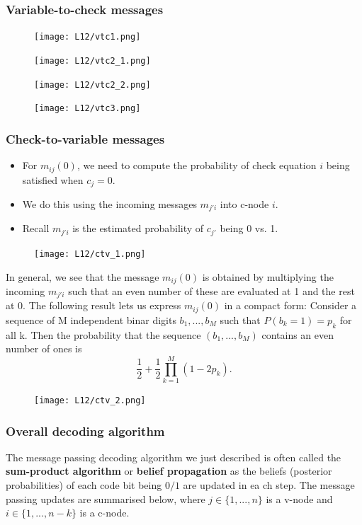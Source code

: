\documentclass[12pt]{article}
\begin{document}
\subsubsection{Variable-to-check messages}
\begin{figure}[H]
    \centering
    \texttt{[image: L12/vtc1.png]}
\end{figure}
\begin{figure}[H]
    \centering
    \texttt{[image: L12/vtc2\_1.png]}
\end{figure}
\begin{figure}[H]
    \centering
    \texttt{[image: L12/vtc2\_2.png]}
\end{figure}
\begin{figure}[H]
    \centering
    \texttt{[image: L12/vtc3.png]}
\end{figure}
\subsubsection{Check-to-variable messages}
\begin{itemize}
    \item For $m_{ij}(0)$, we need to compute the probability of check equation $i$ being satisfied when $c_j=0$.
    \item We do this using the incoming messages $m_{j'i}$ into c-node $i$.
    \item Recall $m_{j'i}$ is the estimated probability of $c_{j'}$ being 0 vs. 1.
\end{itemize}
\begin{figure}[H]
    \centering
    \texttt{[image: L12/ctv\_1.png]}
\end{figure}
In general, we see that the message $m_{ij}(0)$ is obtained by multiplying the incoming $m_{j'i}$ such that an even number of these are evaluated at 1 and the rest at 0. 
The following result lets us express $m_{ij}(0)$ in a compact form:
Consider a sequence of M independent binar digits $b_1,...,b_M$ such that $P(b_k=1)=p_k$ for all k. Then the probability that the sequence $(b_1,...,b_M)$ contains an even number of ones is \[
\frac{1}{2} + \frac{1}{2}\prod_{k=1}^M(1-2p_k).
\]
\begin{figure}[H]
    \centering
    \texttt{[image: L12/ctv\_2.png]}
\end{figure}
\subsubsection{Overall decoding algorithm}
The message passing decoding algorithm we just described is often called the \textbf{sum-product algorithm} or  \textbf{belief propagation} as the beliefs (posterior probabilities) of each code bit being $0/1$ are updated in ea ch step.
The message passing updates are summarised below, where $j\in \{1,...,n \}$ is a v-node and $i\in \{1,...,n-k \}$ is a c-node.
\end{document}
